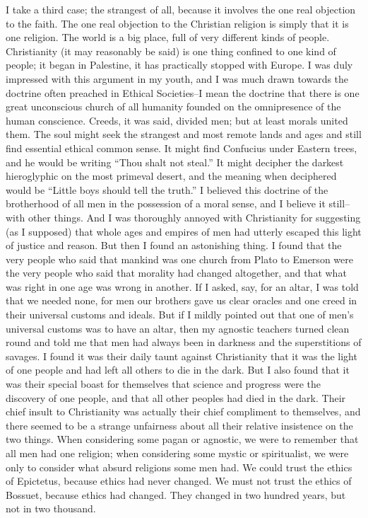 \documentclass{book}
\begin{document}
I take a third case; the strangest of all, because it involves the one real objection to the faith. The one real objection to the Christian religion is simply that it is one religion. The world is a big place, full of very different kinds of people. Christianity (it may reasonably be said) is one thing confined to one kind of people; it began in Palestine, it has practically stopped with Europe. I was duly impressed with this argument in my youth, and I was much drawn towards the doctrine often preached in Ethical Societies–I mean the doctrine that there is one great unconscious church of all humanity founded on the omnipresence of the human conscience. Creeds, it was said, divided men; but at least morals united them. The soul might seek the strangest and most remote lands and ages and still find essential ethical common sense. It might find Confucius under Eastern trees, and he would be writing “Thou shalt not steal.” It might decipher the darkest hieroglyphic on the most primeval desert, and the meaning when deciphered would be “Little boys should tell the truth.” I believed this doctrine of the brotherhood of all men in the possession of a moral sense, and I believe it still–with other things. And I was thoroughly annoyed with Christianity for suggesting (as I supposed) that whole ages and empires of men had utterly escaped this light of justice and reason. But then I found an astonishing thing. I found that the very people who said that mankind was one church from Plato to Emerson were the very people who said that morality had changed altogether, and that what was right in one age was wrong in another. If I asked, say, for an altar, I was told that we needed none, for men our brothers gave us clear oracles and one creed in their universal customs and ideals. But if I mildly pointed out that one of men’s universal customs was to have an altar, then my agnostic teachers turned clean round and told me that men had always been in darkness and the superstitions of savages. I found it was their daily taunt against Christianity that it was the light of one people and had left all others to die in the dark. But I also found that it was their special boast for themselves that science and progress were the discovery of one people, and that all other peoples had died in the dark. Their chief insult to Christianity was actually their chief compliment to themselves, and there seemed to be a strange unfairness about all their relative insistence on the two things. When considering some pagan or agnostic, we were to remember that all men had one religion; when considering some mystic or spiritualist, we were only to consider what absurd religions some men had. We could trust the ethics of Epictetus, because ethics had never changed. We must not trust the ethics of Bossuet, because ethics had changed. They changed in two hundred years, but not in two thousand.
\end{document}
